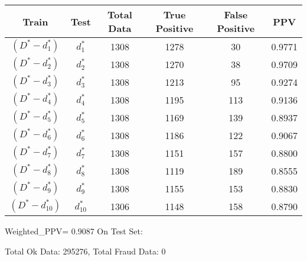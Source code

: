 \begin{table}[h]
\centering
\begin{tabular}{c|c|c|c|c|c|}
Train & Test & Total Data &True Positive &False Positive&PPV \\ 
 \hline
\hline$(D^*-{d_{1}^*})$ & $d_{1}^*$ & 1308 & 1278 & 30 & 0.9771 \\ 
$(D^*-{d_{2}^*})$ & $d_{2}^*$ & 1308 & 1270 & 38 & 0.9709 \\ 
$(D^*-{d_{3}^*})$ & $d_{3}^*$ & 1308 & 1213 & 95 & 0.9274 \\ 
$(D^*-{d_{4}^*})$ & $d_{4}^*$ & 1308 & 1195 & 113 & 0.9136 \\ 
$(D^*-{d_{5}^*})$ & $d_{5}^*$ & 1308 & 1169 & 139 & 0.8937 \\ 
$(D^*-{d_{6}^*})$ & $d_{6}^*$ & 1308 & 1186 & 122 & 0.9067 \\ 
$(D^*-{d_{7}^*})$ & $d_{7}^*$ & 1308 & 1151 & 157 & 0.8800 \\ 
$(D^*-{d_{8}^*})$ & $d_{8}^*$ & 1308 & 1119 & 189 & 0.8555 \\ 
$(D^*-{d_{9}^*})$ & $d_{9}^*$ & 1308 & 1155 & 153 & 0.8830 \\ 
$(D^*-{d_{10}^*})$ & $d_{10}^*$ & 1306 & 1148 & 158 & 0.8790 \\ 
\end{tabular}
\end{table}

Weighted_PPV= 0.9087
On Test Set: \hline 
 
 Total Ok Data: 295276, Total Fraud Data: 0